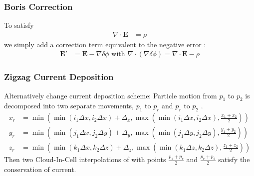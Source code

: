 \documentclass[5pt]{beamer}
\begin{document}
  \begin{frame}
  \frametitle{Boris Correction}
  To satisfy
  \begin{align*}
  \nabla \cdot \mathbf{E} &= \rho
  \end{align*}
  we simply add a correction term equivalent to the negative error \cite{Lund2016}:
  \begin{align}
  \mathbf{E'} &= \mathbf{E} - \nabla\delta\phi \text{ with } \nabla \cdot \left(\nabla\delta\phi\right) = \nabla \cdot \mathbf{E} - \rho
  \end{align}
  \end{frame}
  \begin{frame}
  \frametitle{Zigzag Current Deposition}
  Alternatively change current deposition scheme: Particle motion from $p_1$ to $p_2$ is decomposed into two separate movements, $p_1$ to $p_r$ and $p_r$ to $p_2$ \cite{fallahi2020mithra}.
  {\scriptsize
  \begin{align*}
      x_r &= \min\left(\min(i_1\Delta x, i_2 \Delta x) + \Delta_x, \max\left(\min(i_1\Delta x, i_2 \Delta x), \frac{x_1 + x_2}{2}\right)\right)\\
      y_r &= \min\left(\min(j_1\Delta x, j_2 \Delta y) + \Delta_y, \max\left(\min(j_1\Delta y, j_2 \Delta y), \frac{y_1 + y_2}{2}\right)\right)\\
      z_r &= \min\left(\min(k_1\Delta x, k_2 \Delta z) + \Delta_z, \max\left(\min(k_1\Delta z, k_2 \Delta z), \frac{z_1 + z_2}{2}\right)\right)
  \end{align*}
  }%
  Then two Cloud-In-Cell interpolations of with points $\frac{p_1 + p_r}{2}$ and $\frac{p_r + p_2}{2}$ \cite{UMEDA200373} satisfy the conservation of current.
  \end{frame}
\end{document}
